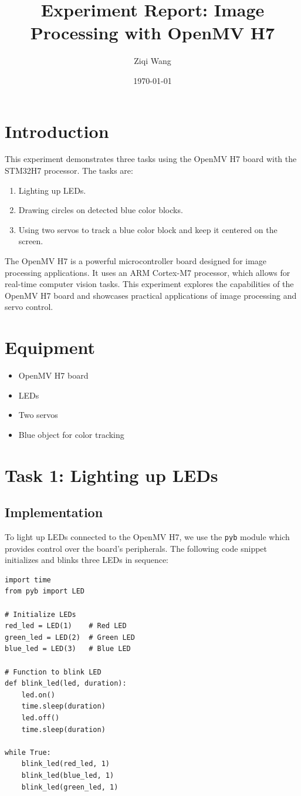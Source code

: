 \documentclass{article}
\title{Experiment Report: Image Processing with OpenMV H7}
\author{Ziqi Wang}
\date{\today}
\begin{document}
\maketitle

\section{Introduction}
This experiment demonstrates three tasks using the OpenMV H7 board with the STM32H7 processor. The tasks are:
\begin{enumerate}
    \item Lighting up LEDs.
    \item Drawing circles on detected blue color blocks.
    \item Using two servos to track a blue color block and keep it centered on the screen.
\end{enumerate}

The OpenMV H7 is a powerful microcontroller board designed for image processing applications. It uses an ARM Cortex-M7 processor, which allows for real-time computer vision tasks. This experiment explores the capabilities of the OpenMV H7 board and showcases practical applications of image processing and servo control.

\section{Equipment}
\begin{itemize}
    \item OpenMV H7 board
    \item LEDs
    \item Two servos
    \item Blue object for color tracking
\end{itemize}

\section{Task 1: Lighting up LEDs}
\subsection{Implementation}
To light up LEDs connected to the OpenMV H7, we use the \texttt{pyb} module which provides control over the board's peripherals. The following code snippet initializes and blinks three LEDs in sequence:
\begin{verbatim}
import time
from pyb import LED

# Initialize LEDs
red_led = LED(1)    # Red LED
green_led = LED(2)  # Green LED
blue_led = LED(3)   # Blue LED

# Function to blink LED
def blink_led(led, duration):
    led.on()
    time.sleep(duration)
    led.off()
    time.sleep(duration)

while True:
    blink_led(red_led, 1)
    blink_led(blue_led, 1)
    blink_led(green_led, 1)
\end{verbatim}
\end{document}
